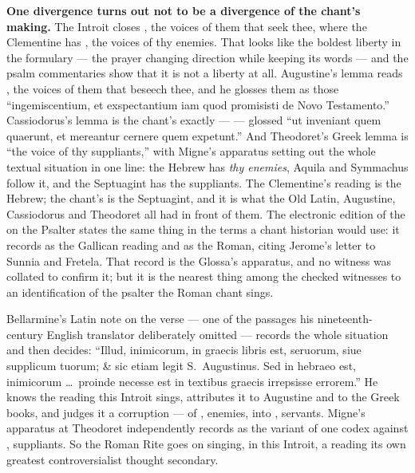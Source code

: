 \textbf{One divergence turns out not to be a divergence of the chant's making.}
The Introit closes , the voices
of them that seek thee, where the Clementine has , the voices of thy enemies. That looks like the boldest liberty in the
formulary --- the prayer changing direction while keeping its words --- and the
psalm commentaries show that it is not a liberty at all. Augustine's lemma
reads , the voices of them that
beseech thee, and he glosses them as those ``ingemiscentium, et exspectantium
iam quod promisisti de Novo Testamento.'' Cassiodorus's lemma is the chant's
exactly ---  --- glossed ``ut
inveniant quem quaerunt, et mereantur cernere quem expetunt.'' And Theodoret's
Greek lemma is ``the voice of thy suppliants,'' with Migne's apparatus setting
out the whole textual situation in one line: the Hebrew has \textit{thy
enemies}, Aquila and Symmachus follow it, and the Septuagint has the
suppliants. The Clementine's reading is the Hebrew; the chant's is the
Septuagint, and it is what the Old Latin, Augustine, Cassiodorus and Theodoret
all had in front of them. The electronic edition of the  on the Psalter states the same thing in the terms a chant historian
would use: it records  as the Gallican reading and
 as the Roman, citing Jerome's letter to Sunnia and Fretela.
That record is the Glossa's apparatus, and no 
witness was collated to confirm it; but it
is the nearest thing among the checked witnesses to an identification of the
psalter the Roman chant sings.

\begin{witnessnote}
Bellarmine's Latin note on the verse --- one of the passages his
nineteenth-century English translator deliberately omitted --- records the
whole situation and then decides: ``Illud, inimicorum, in graecis libris est,
seruorum, siue supplicum tuorum; \& sic etiam legit S.\ Augustinus. Sed in
hebraeo est, inimicorum \dots\ proinde necesse est in textibus graecis
irrepsisse errorem.'' He knows the reading this Introit sings, attributes it to
Augustine and to the Greek books, and judges it a corruption --- of
, enemies, into , servants. Migne's apparatus at
Theodoret independently records  as the variant of one codex
against , suppliants. So the Roman Rite goes on singing, in this
Introit, a reading its own greatest controversialist thought secondary.
\end{witnessnote}

